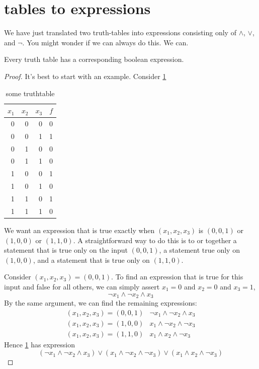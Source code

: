 \message{ !name(truth.tex)}\documentclass{scrbook}
\begin{document}
\section[Tables to Expressions]{tables to expressions}
We have just translated two truth-tables into expressions consisting only of $\wedge$, $\vee$, and $\neg$. You might wonder if we can always do this. We can. 
\begin{theorem}[completeness]
  Every truth table has a corresponding boolean expression.
\end{theorem}
\begin{proof}
  It's best to start with an example. Consider \cref{tt:complete}
  \begin{table}[h!]
    \centering
  \caption{some truthtable}\label{tt:complete}
\begin{tabular}{rrrr}
$x_1$ & $x_2$ & $x_3$ & $f$ \\
\hline
0 & 0 & 0 & 0 \\
\rowcolor{LightCyan} 0 & 0 & 1 & 1 \\
0 & 1 & 0 & 0 \\
0 & 1 & 1 & 0 \\
\rowcolor{LightCyan} 1 & 0 & 0 & 1 \\
1 & 0 & 1 & 0 \\
\rowcolor{LightCyan} 1 & 1 & 0 & 1 \\
1 & 1 & 1 & 0 
\end{tabular}
\end{table}
We want an expression that is true exactly when $(x_1,x_2,x_3)$ is $(0,0,1)$ or $(1,0,0)$ or $(1,1,0)$. A straightforward way to do this is to or together a statement that is true only on the input $(0,0,1)$, a statement true only on $(1,0,0)$, and a statement that is true only on $(1,1,0)$. 

Consider $(x_1,x_2,x_3)=(0,0,1)$. To find an expression that is true for this input and false for all others, we can simply assert $x_1=0$ and $x_2=0$ and $x_3=1$, \ie
\[
\neg x_1\wedge \neg x_2 \wedge x_3
\]
By the same argument, we can find the remaining expressions:
\[
\begin{matrix}
 (x_1,x_2,x_3)=(0,0,1) & \neg x_1 \wedge \neg x_2 \wedge x_3 \\
 (x_1,x_2,x_3)=(1,0,0) & x_1 \wedge \neg x_2 \wedge \neg x_3 \\
 (x_1,x_2,x_3)=(1,1,0) & x_1 \wedge x_2 \wedge \neg x_3 
\end{matrix}
\]
Hence \cref{tt:complete} has expression 
\[
(\neg x_1 \wedge \neg x_2 \wedge x_3 ) \vee (x_1 \wedge \neg x_2 \wedge \neg x_3) \vee  (x_1 \wedge x_2 \wedge \neg x_3)
\]


\end{proof}
\end{document}
